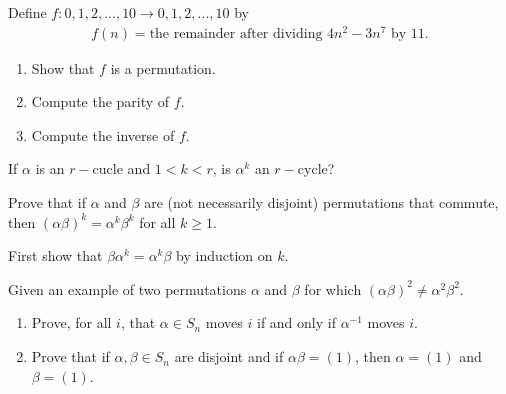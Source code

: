 \documentclass[12pt]{article}
\newenvironment{exercise}[2][Exercise]{\begin{trivlist}
\item[\hskip \labelsep {\bfseries #1}\hskip \labelsep {\bfseries #2.}]}
{\end{trivlist}}
\newenvironment{hint}[2][Hint]{\begin{trivlist}
    \item[\hskip \labelsep {\bfseries #1}\hskip \labelsep {\bfseries #2.}]}
    {\end{trivlist}}
\begin{document}
\begin{exercise}{1.18}
    Define $f:{0,1,2,...,10} \rightarrow {0,1,2,...,10}$ by 
    \begin{align*}
        f(n)= \text{the remainder after dividing } 4n^2-3n^7 \text{ by 11.}
    \end{align*}

    \begin{enumerate}
        \item[(i)] Show that $f$ is a permutation.
        \item[(ii)] Compute the parity of $f$.
        \item[(iii)] Compute the inverse of $f$.
    \end{enumerate}
    
\end{exercise}



\begin{exercise}{1.19}
    If $\alpha$ is an $r-$cucle and $1<k<r$, is $\alpha^k$ an $r-$cycle?
\end{exercise}

\begin{exercise}{1.20}
    \begin{enumerate}
        \item[(i)] Prove that if $\alpha$ and $\beta$ are (not necessarily disjoint) permutations that commute, then $(\alpha\beta)^k=\alpha^k\beta^k$ for all $k\geq1$.
        \begin{hint}{}
            First show that $\beta\alpha^k = \alpha^k \beta$ by induction on $k$.
        \end{hint}
        \item[(ii)] Given an example of two permutations $\alpha$ and $\beta$ for which $(\alpha\beta)^2\neq \alpha^2\beta^2$.
    \end{enumerate}
\end{exercise}

\begin{exercise}{1.21}
    \begin{enumerate}
        \item[(i)] Prove, for all $i$, that $\alpha \in S_n$ moves $i$ if and only if $\alpha^{-1}$ moves $i$.
        \item[(ii)] Prove that if $\alpha,\beta \in S_n$ are disjoint and if $\alpha\beta=(1)$, then $\alpha=(1)$ and $\beta=(1)$.
    \end{enumerate}
    
\end{exercise}
\end{document}
